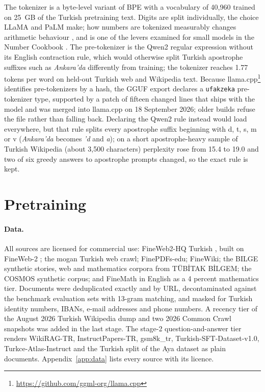 \documentclass[11pt]{article}
\begin{document}
The tokenizer is a byte-level variant of BPE \cite{bpe} with a vocabulary of 40,960 trained on 25~GB of the Turkish pretraining text. Digits are split individually, the choice LLaMA \cite{llama} and PaLM \cite{palm} make; how numbers are tokenized measurably changes arithmetic behaviour \cite{tokcounts}, and is one of the levers examined for small models in the Number Cookbook \cite{numbercookbook}. The pre-tokenizer is the Qwen2 regular expression without its English contraction rule, which would otherwise split Turkish apostrophe suffixes such as \emph{Ankara'da} differently from training; the tokenizer reaches 1.77 tokens per word on held-out Turkish web and Wikipedia text. Because llama.cpp\footnote{\url{https://github.com/ggml-org/llama.cpp}} identifies pre-tokenizers by a hash, the GGUF export declares a \texttt{ufakzeka} pre-tokenizer type, supported by a patch of fifteen changed lines that ships with the model and was merged into llama.cpp on 18 September 2026; older builds refuse the file rather than falling back. Declaring the Qwen2 rule instead would load everywhere, but that rule splits every apostrophe suffix beginning with d, t, s, m or v (\emph{Ankara'da} becomes \emph{'d} and \emph{a}); on a short apostrophe-heavy sample of Turkish Wikipedia (about 3,500 characters) perplexity rose from 15.4 to 19.0 and two of six greedy answers to apostrophe prompts changed, so the exact rule is kept.

\section{Pretraining}\label{sec:pretrain}
\paragraph{Data.} All sources are licensed for commercial use: FineWeb2-HQ Turkish \cite{fw2hq}, built on FineWeb-2 \cite{fineweb2}; the mogan Turkish web crawl; FinePDFs-edu; FineWiki; the BILGE synthetic stories, web and mathematics corpora from T\"UB\.ITAK B\.ILGEM; the COSMOS synthetic corpus; and FineMath in English as a 4 percent mathematics tier. Documents were deduplicated exactly and by URL, decontaminated against the benchmark evaluation sets with 13-gram matching, and masked for Turkish identity numbers, IBANs, e-mail addresses and phone numbers. A recency tier of the August 2026 Turkish Wikipedia dump and two 2026 Common Crawl snapshots was added in the last stage. The stage-2 question-and-answer tier renders WikiRAG-TR, InstructPapers-TR, gsm8k\_tr, Turkish-SFT-Dataset-v1.0, Turkce-Atlas-Instruct and the Turkish split of the Aya dataset \cite{aya} as plain documents. Appendix~\ref{app:data} lists every source with its licence.
\end{document}
